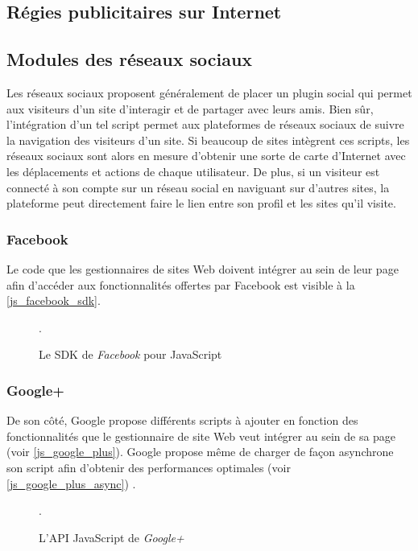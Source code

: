 \subsection{Régies publicitaires sur Internet}

\subsection{Modules des réseaux sociaux}
Les réseaux sociaux proposent généralement de placer un plugin social qui permet aux visiteurs d'un site d'interagir et de partager avec leurs amis. Bien sûr, l'intégration d'un tel script permet aux plateformes de réseaux sociaux de suivre la navigation des visiteurs d'un site. Si beaucoup de sites intègrent ces scripts, les réseaux sociaux sont alors en mesure d'obtenir une sorte de carte d'Internet avec les déplacements et actions de chaque utilisateur. De plus, si un visiteur est connecté à son compte sur un réseau social en naviguant sur d'autres sites, la plateforme peut directement faire le lien entre son profil et les sites qu'il visite.

\subsubsection{Facebook}
Le code que les gestionnaires de sites Web doivent intégrer au sein de leur page afin d'accéder aux fonctionnalités offertes par Facebook \cite{javascript_facebook_sdk} est visible à la \autoref{js_facebook_sdk}.

\begin{figure}[h]
	\centering
	
	\caption{\label{js_facebook_sdk}Le SDK de \textit{Facebook} pour JavaScript}.
\end{figure}

\subsubsection{Google+}
De son côté, Google propose différents scripts à ajouter en fonction des fonctionnalités que le gestionnaire de site Web veut intégrer au sein de sa page (voir \autoref{js_google_plus}). Google propose même de charger de façon asynchrone son script afin d'obtenir des performances optimales (voir \autoref{js_google_plus_async}) \cite{javascript_google_plus}.

\begin{figure}[h]
	\centering
	
	\caption{\label{js_google_plus}L'API JavaScript de \textit{Google+}}.
\end{figure}

